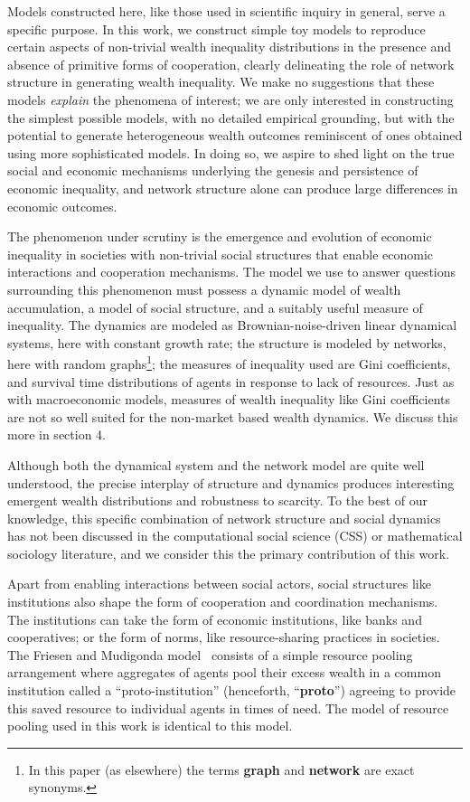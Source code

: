 Models constructed here, like those used in scientific inquiry in general, serve a specific purpose. In this work, we construct simple toy models to reproduce certain aspects of non-trivial wealth inequality distributions in the presence and absence of primitive forms of cooperation, clearly delineating the role of network structure in generating wealth inequality. We make no suggestions that these models \textit{explain} the phenomena of interest; we are only interested in constructing the simplest possible models, with no detailed empirical grounding, but with the potential to generate heterogeneous wealth outcomes reminiscent of ones obtained using more sophisticated models. In doing so, we aspire to shed light on the true social and economic mechanisms underlying the genesis and persistence of economic inequality, and network structure alone can produce large differences in economic outcomes. 


\label{giniKindaSucks}
The phenomenon under scrutiny is the emergence and evolution of economic inequality in societies with non-trivial social structures that enable economic interactions and cooperation mechanisms. The model we use to answer questions surrounding this phenomenon must possess a dynamic model of wealth accumulation, a model of social structure, and a suitably useful measure of inequality. The dynamics are modeled as Brownian-noise-driven linear dynamical systems, here with constant growth rate; the structure is modeled by networks, here with random graphs\footnote{In this paper (as elsewhere) the terms \textbf{graph} and \textbf{network} are exact synonyms.}; the measures of inequality used are Gini coefficients, and survival time distributions of agents in response to lack of resources. Just as with macroeconomic models, measures of wealth inequality like Gini coefficients are not so well suited for the non-market based wealth dynamics. We discuss this more in section 4. 


Although both the dynamical system and the network model are quite well understood, the precise interplay of structure and dynamics produces interesting emergent wealth distributions and robustness to scarcity. To the best of our knowledge, this specific combination of network structure and social dynamics has not been discussed in the computational social science (CSS) or mathematical sociology literature, and we consider this the primary contribution of this work. 

Apart from enabling interactions between social actors, social structures like institutions also shape the form of cooperation and coordination mechanisms. The institutions can take the form of economic institutions, like banks and cooperatives; or the form of norms, like resource-sharing practices in societies. The Friesen and Mudigonda model~\cite{srimil} consists of a simple resource pooling arrangement where aggregates of agents pool their excess wealth in a common institution called a ``proto-institution'' (henceforth, ``\textbf{proto}'') agreeing to provide this saved resource to individual agents in times of need. The model of resource pooling used in this work is identical to this model. 

